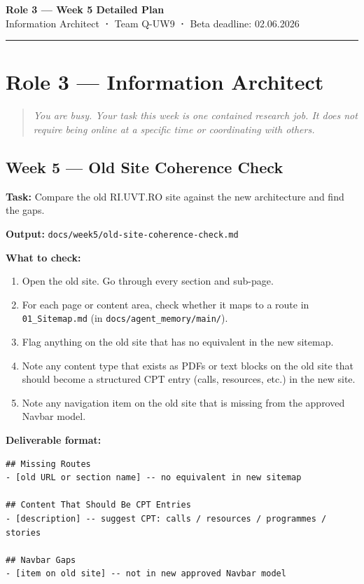 \documentclass[11pt,a4paper]{article}
\begin{document}
\begin{center}
    {\Large\bfseries\color{uvtBlue} Role 3 — Week 5 Detailed Plan}\\[0.4em]
    {\small Information Architect \textbf{·} Team Q-UW9 \textbf{·} Beta deadline: 02.06.2026}
\end{center}
\vspace{0.3em}
\textcolor{uvtYellow}{\rule{\linewidth}{2pt}}
\vspace{0.8em}
\section{Role 3 — Information Architect}

\begin{quote}\itshape
You are busy. Your task this week is one contained research job. It does not require being online at a specific time or coordinating with others.
\end{quote}

\subsection{Week 5 — Old Site Coherence Check}

\textbf{Task:} Compare the old RI.UVT.RO site against the new architecture and find the gaps.

\textbf{Output:} \nolinkurl{docs/week5/old-site-coherence-check.md}

\textbf{What to check:}

\begin{enumerate}
\item Open the old site. Go through every section and sub-page.
\item For each page or content area, check whether it maps to a route in \nolinkurl{01_Sitemap.md} (in \nolinkurl{docs/agent_memory/main/}).
\item Flag anything on the old site that has no equivalent in the new sitemap.
\item Note any content type that exists as PDFs or text blocks on the old site that should become a structured CPT entry (calls, resources, etc.) in the new site.
\item Note any navigation item on the old site that is missing from the approved Navbar model.
\end{enumerate}

\textbf{Deliverable format:}

\begin{lstlisting}
## Missing Routes
- [old URL or section name] -- no equivalent in new sitemap

## Content That Should Be CPT Entries
- [description] -- suggest CPT: calls / resources / programmes / stories

## Navbar Gaps
- [item on old site] -- not in new approved Navbar model
\end{lstlisting}
\end{document}
